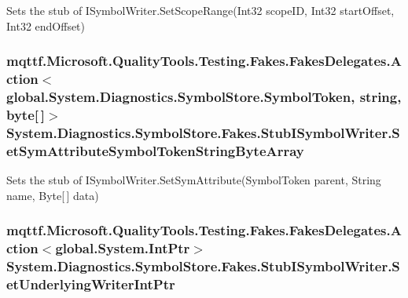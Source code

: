 Sets the stub of I\-Symbol\-Writer.\-Set\-Scope\-Range(\-Int32 scope\-I\-D, Int32 start\-Offset, Int32 end\-Offset)

\hypertarget{class_system_1_1_diagnostics_1_1_symbol_store_1_1_fakes_1_1_stub_i_symbol_writer_a18844f78fd4915bd440ec664e2e778b7}{
\subsubsection[{Set\-Sym\-Attribute\-Symbol\-Token\-String\-Byte\-Array}]{\setlength{\rightskip}{0pt plus 5cm}mqttf.\-Microsoft.\-Quality\-Tools.\-Testing.\-Fakes.\-Fakes\-Delegates.\-Action$<$global.\-System.\-Diagnostics.\-Symbol\-Store.\-Symbol\-Token, string, byte\mbox{[}$\,$\mbox{]}$>$ System.\-Diagnostics.\-Symbol\-Store.\-Fakes.\-Stub\-I\-Symbol\-Writer.\-Set\-Sym\-Attribute\-Symbol\-Token\-String\-Byte\-Array}}\label{class_system_1_1_diagnostics_1_1_symbol_store_1_1_fakes_1_1_stub_i_symbol_writer_a18844f78fd4915bd440ec664e2e778b7}


Sets the stub of I\-Symbol\-Writer.\-Set\-Sym\-Attribute(\-Symbol\-Token parent, String name, Byte\mbox{[}$\,$\mbox{]} data)

\hypertarget{class_system_1_1_diagnostics_1_1_symbol_store_1_1_fakes_1_1_stub_i_symbol_writer_ade5d39aca72755ad4564e92a567e2241}{
\subsubsection[{Set\-Underlying\-Writer\-Int\-Ptr}]{\setlength{\rightskip}{0pt plus 5cm}mqttf.\-Microsoft.\-Quality\-Tools.\-Testing.\-Fakes.\-Fakes\-Delegates.\-Action$<$global.\-System.\-Int\-Ptr$>$ System.\-Diagnostics.\-Symbol\-Store.\-Fakes.\-Stub\-I\-Symbol\-Writer.\-Set\-Underlying\-Writer\-Int\-Ptr}}\label{class_system_1_1_diagnostics_1_1_symbol_store_1_1_fakes_1_1_stub_i_symbol_writer_ade5d39aca72755ad4564e92a567e2241}


